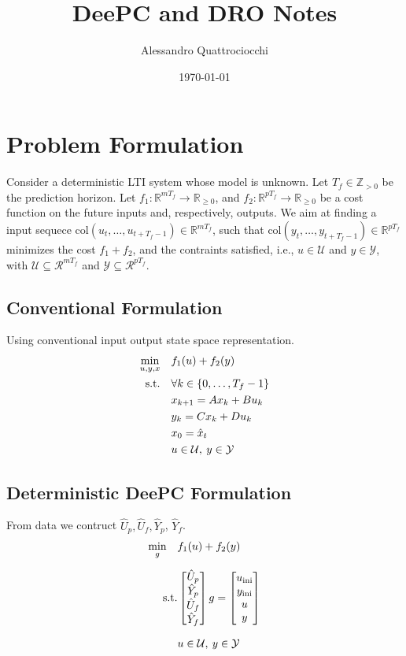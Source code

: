 \documentclass[12pt, a4paper]{article}
\title{DeePC and DRO Notes}
\author{Alessandro Quattrociocchi}
\date{\today}
\begin{document}
\maketitle
\tableofcontents

\section{Problem Formulation}
Consider a deterministic LTI system whose model is unknown. 
\noindent Let $T_f \in \mathbb{Z}_{> 0}$ be the prediction horizon. Let $f_1 : \mathbb{R}^{mT_f} \rightarrow \mathbb{R}_{\geq0}$, and $f_2 : \mathbb{R}^{pT_f} \rightarrow \mathbb{R}_{\geq0}$ be a cost function on the future inputs and, respectively, outputs. We aim at finding a input sequece $\text{col}(u_t, \dots, u_{t+T_f-1}) \in \mathbb{R}^{mT_f}$, such that $\text{col}(y_t, \dots, y_{t+T_f-1}) \in \mathbb{R}^{pT_f}$ minimizes the cost $f_1 + f_2$, and the contraints satisfied, i.e., $u \in \mathcal{U}$ and $y \in \mathcal{Y}$, with $\mathcal{U} \subseteq \mathcal{R}^{mT_f}$ and $\mathcal{Y} \subseteq \mathcal{R}^{pT_f}$.

\subsection{Conventional Formulation}
Using conventional input output state space representation. 
\begin{align} \label{eq:conventional}
    \min_{u,y,x} \quad & f_1(u) +f_2(y) \notag\\
    \text{s.t.} \quad & \forall k \in {\{0, \dots, T_f -1\}}\notag\\
    \quad & {x}_{k+1} = Ax_k + Bu_k \notag\\
    \quad & {y}_{k} = Cx_k + Du_k \notag\\
    & x_0 = \hat{x}_t \notag\\
    & u \in \mathcal{U}, \: y \in \mathcal{Y} 
\end{align}

\subsection{Deterministic DeePC Formulation}
From data we contruct $\hat{U}_p, \hat{U}_f, \hat{Y}_p$, $\hat{Y}_f$.
\begin{align}
    \min_{g} \quad & f_1(u) + f_2(y) \notag\\[0.2cm]
    \text{s.t.} 
    &\begin{bmatrix} 
        \hat{U}_p \\ 
        \hat{Y}_p \\ 
        \hat{U}_f \\ 
        \hat{Y}_f 
        \end{bmatrix}g = \begin{bmatrix} 
            u_{\text{ini}} \\ 
            y_{\text{ini}}\\ 
            u \notag \\ 
            y
            \end{bmatrix}\\[0.2cm]
            & u \in \mathcal{U}, \: y \in \mathcal{Y} 
\end{align}
\end{document}
